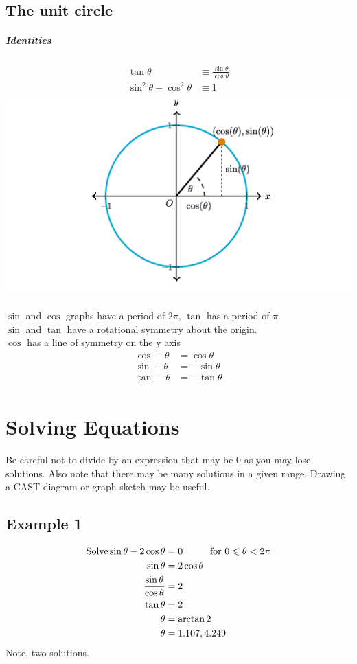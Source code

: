 \documentclass[a4paper,12pt]{article}
\begin{document}
\subsection*{The unit circle}
\subparagraph*{Identities}
\begin{align*}
\tan \theta & \equiv \frac{\sin \theta}{\cos \theta} \\
\sin^2 \theta + \cos^2 \theta & \equiv 1 \\
\end{align*}
\includegraphics[scale=0.7]{UnitCircle} \\\\
$\sin$ and $\cos$ graphs have a period of $2\pi$, $\tan$ has a period of $\pi$. \\
$\sin$ and $\tan$ have a rotational symmetry about the origin. \\
$\cos$ has a line of symmetry on the y axis \\
\begin{align*}
\cos - \theta & = \cos \theta \\
\sin - \theta & = - \sin \theta \\
\tan - \theta & = - \tan \theta \\ 
\end{align*}
\section*{Solving Equations}
Be careful not to divide by an expression that may be 0 as you may lose solutions. Also note that there may be many solutions in a given range. Drawing a CAST diagram or graph sketch may be useful.
\subsection*{Example 1}
\begin{align*}
\text{Solve} \sin \theta - 2 \cos \theta & = 0 \hspace*{1cm} \text{for } 0 \leqslant \theta < 2\pi \\
\sin \theta & = 2 \cos \theta \\
\frac{\sin \theta}{\cos \theta} & = 2 \\
\tan \theta & = 2 \\
\theta & = \arctan 2 \\
\theta & = 1.107, 4.249 \\
\end{align*}
Note, two solutions.
\end{document}
